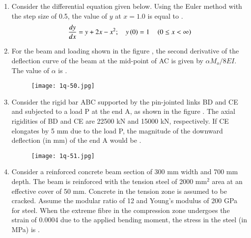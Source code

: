 \documentclass[journal,12pt,onecolumn]{article}
\theoremstyle{remark}
\begin{document}
\begin{enumerate}
\hfill{}

\item Consider the differential equation given below. Using the Euler method with the step size  of 0.5, the value of $y$ at $x=1.0$ is equal to \underline{\hspace{2cm}} .
\begin{align} \frac{dy}{dx} = y + 2x - x^2; \quad y\left(0\right) = 1 \quad \left(0 \le x < \infty\right) \end{align}

\hfill{}

\item For the beam and loading shown in the figure  , the second derivative of the deflection curve of the beam at the mid-point of AC is given by $\alpha M_o / 8EI$. The value of $\alpha$ is \underline{\hspace{2cm}} .
\begin{figure}[H]
    \centering
    \texttt{[image: 1q-50.jpg]}
    \caption{}
    \label{fig:q50}
\end{figure}

\hfill{}

\item Consider the rigid bar ABC supported by the pin-jointed links BD and CE and subjected to a load P at the end A, as shown in the figure . The axial rigidities of BD and CE are 22500 kN and 15000 kN, respectively. If CE elongates by 5 mm due to the load P, the magnitude of the downward deflection (in mm) of the end A would be \underline{\hspace{2cm}} .
\begin{figure}[H]
    \centering
    \texttt{[image: 1q-51.jpg]}
    \caption{}
    \label{fig:q51}
\end{figure}

\hfill{}

\item Consider a reinforced concrete beam section of 300 mm width and 700 mm depth. The beam is reinforced with the tension steel of 2000 mm$^2$ area at an effective cover of 50 mm. Concrete in the tension zone is assumed to be cracked. Assume the modular ratio of 12 and Young's modulus of 200 GPa for steel. When the extreme fibre in the compression zone undergoes the strain of 0.0004 due to the applied bending moment, the stress in the steel (in MPa) is \underline{\hspace{2cm}} .


\end{enumerate}
\end{document}
